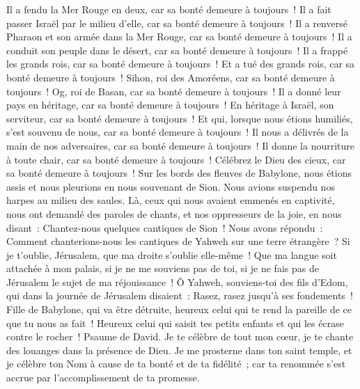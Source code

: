 \begin{multicols}{2}
Il a fendu la Mer Rouge en deux, car sa bonté demeure à toujours~!
Il a fait passer Israël par le milieu d'elle, car sa bonté demeure à toujours~!
Il a renversé Pharaon et son armée dans la Mer Rouge, car sa bonté demeure à toujours~!
Il a conduit son peuple dans le désert, car sa bonté demeure à toujours~!
Il a frappé les grands rois, car sa bonté demeure à toujours~!
Et a tué des grands rois, car sa bonté demeure à toujours~!
Sihon, roi des Amoréens, car sa bonté demeure à toujours~!
Og, roi de Basan, car sa bonté demeure à toujours~!
Il a donné leur pays en héritage, car sa bonté demeure à toujours~!
En héritage à Israël, son serviteur, car sa bonté demeure à toujours~!
Et qui, lorsque nous étions humiliés, s'est souvenu de nous, car sa bonté demeure à toujours~!
Il nous a délivrés de la main de nos adversaires, car sa bonté demeure à toujours~!
Il donne la nourriture à toute chair, car sa bonté demeure à toujours~!
Célébrez le Dieu des cieux, car sa bonté demeure à toujours~!
\VerseOne{}Sur les bords des fleuves de Babylone, nous étions assis et nous pleurions en nous souvenant de Sion.
Nous avions suspendu nos harpes au milieu des saules.
Là, ceux qui nous avaient emmenés en captivité, nous ont demandé des paroles de chants, et nos oppresseurs de la joie, en nous disant~: Chantez-nous quelques cantiques de Sion~! Nous avons répondu~:
Comment chanterions-nous les cantiques de Yahweh sur une terre étrangère~?
Si je t'oublie, Jérusalem, que ma droite s'oublie elle-même~!
Que ma langue soit attachée à mon palais, si je ne me souviens pas de toi, si je ne fais pas de Jérusalem le sujet de ma réjouissance~!
Ô Yahweh, souviens-toi des fils d'Edom, qui dans la journée de Jérusalem disaient~: Rasez, rasez jusqu'à ses fondements~!
Fille de Babylone, qui va être détruite, heureux celui qui te rend la pareille de ce que tu nous as fait~!
Heureux celui qui saisit tes petits enfants et qui les écrase contre le rocher~!
\VerseOne{}Psaume de David. Je te célèbre de tout mon cœur, je te chante des louanges dans la présence de Dieu.
Je me prosterne dans ton saint temple, et je célèbre ton Nom à cause de ta bonté et de ta fidélité~; car ta renommée s'est accrue par l'accomplissement de ta promesse.

\end{multicols}
